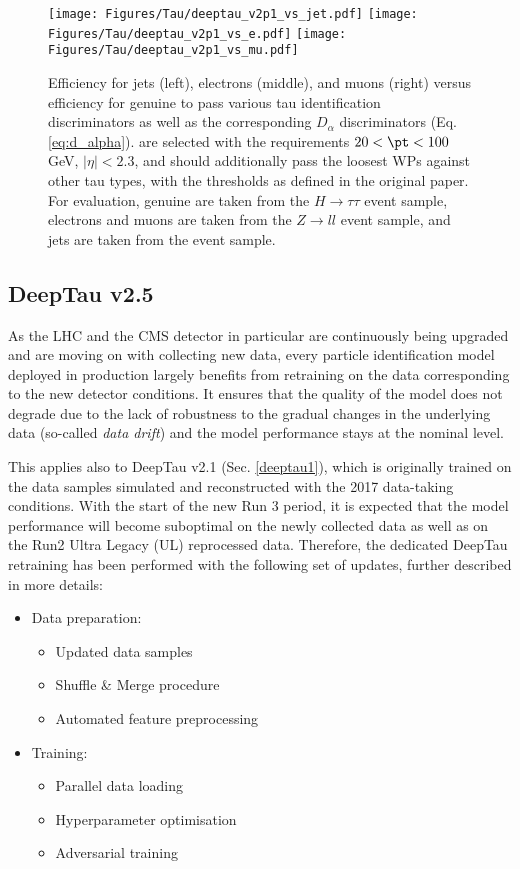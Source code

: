 \begin{figure}[t!]
    \centering
    \texttt{[image: Figures/Tau/deeptau\_v2p1\_vs\_jet.pdf]}
    \texttt{[image: Figures/Tau/deeptau\_v2p1\_vs\_e.pdf]}
    \texttt{[image: Figures/Tau/deeptau\_v2p1\_vs\_mu.pdf]}
    \caption{Efficiency for jets (left), electrons (middle), and muons (right) versus efficiency for genuine \tauh to pass various tau identification discriminators as well as the corresponding $D_\alpha$ discriminators (Eq. \ref{eq:d_alpha}). \tauh are selected with the requirements $20 < \pt < 100$ GeV, $|\eta| < 2.3$, and should additionally pass the loosest WPs against other tau types, with the thresholds as defined in the original paper. For evaluation, genuine \tauh are taken from the $H \to \tau\tau$ event sample, electrons and muons are taken from the $Z \to ll$ event sample, and jets are taken from the \ttbar event sample.}
    \label{fig:deeptau_v2p1_performance}
\end{figure}

\subsection{DeepTau v2.5} \label{deeptau5}
As the LHC and the CMS detector in particular are continuously being upgraded and are moving on with collecting new data, every particle identification model deployed in production largely benefits from retraining on the data corresponding to the new detector conditions. It ensures that the quality of the model does not degrade due to the lack of robustness to the gradual changes in the underlying data (so-called \textit{data drift}) and the model performance stays at the nominal level.

This applies also to DeepTau v2.1 (Sec. \ref{deeptau1}), which is originally trained on the data samples simulated and reconstructed with the 2017 data-taking conditions. With the start of the new Run 3 period, it is expected that the model performance will become suboptimal on the newly collected data as well as on the Run2 Ultra Legacy (UL) reprocessed data. Therefore, the dedicated DeepTau retraining has been performed with the following set of updates, further described in more details: 

\begin{itemize}
    \item Data preparation:
    \begin{itemize}
        \item Updated data samples
        \item Shuffle \& Merge procedure
        \item Automated feature preprocessing
    \end{itemize}
    \item Training:
    \begin{itemize}
        \item Parallel data loading 
        \item Hyperparameter optimisation
        \item Adversarial training
    \end{itemize}
\end{itemize}

